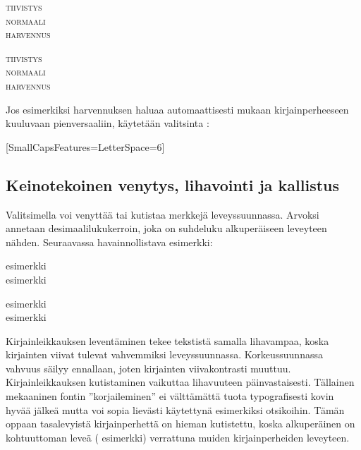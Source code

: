 \begin{koodilohkosis}
\scshape { tiivistys} \\
normaali \\ { harvennus}
\end{koodilohkosis}

\begin{tulossis}
  \scshape { tiivistys} \\
  normaali \\ { harvennus}
\end{tulossis}

\noindent
Jos esimerkiksi harvennuksen haluaa automaattisesti mukaan
kirjainperheeseen kuuluvaan pienversaaliin, käytetään valitsinta
:

\begin{koodilohkosis}
\setmainfont{…}[SmallCapsFeatures={LetterSpace=6}]
\end{koodilohkosis}

\subsection{Keinotekoinen venytys, lihavointi ja kallistus}
\label{luku/fontit-venytys}

Valitsimella  voi venyttää tai kutistaa merkkejä
leveyssuunnassa. Arvoksi annetaan desimaalilukukerroin, joka on
suhdeluku alkuperäiseen leveyteen nähden. Seuraavassa havainnollistava
esimerkki:

\begin{koodilohkosis}
esimerkki \\
{ esimerkki}
\end{koodilohkosis}

\begin{tulossis}
  esimerkki \\
  { esimerkki}
\end{tulossis}

\noindent
Kirjainleikkauksen leventäminen tekee tekstistä samalla lihavampaa,
koska kirjainten viivat tulevat vahvemmiksi leveyssuunnassa.
Korkeussuunnassa vahvuus säilyy ennallaan, joten kirjainten
viivakontrasti muuttuu. Kirjainleikkauksen kutistaminen vaikuttaa
lihavuuteen päinvastaisesti. Tällainen mekaaninen fontin
''korjaileminen'' ei välttämättä tuota typografisesti kovin hyvää jälkeä
mutta voi sopia lievästi käytettynä esimerkiksi otsikoihin. Tämän oppaan
tasalevyistä kirjainperhettä on hieman kutistettu, koska alkuperäinen on
kohtuuttoman leveä ({\ttfamily{}
  esimerkki}) verrattuna muiden kirjainperheiden leveyteen.

